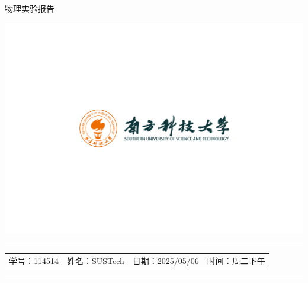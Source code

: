 \documentclass[12pt,a4paper]{article}
\begin{document}
	\noindent
	\hspace{-2em}
	\begin{minipage}[c]{0.65\textwidth}
		\raggedright
		{\fontsize{40pt}{60pt}\selectfont 物理实验报告}
	\end{minipage}
	\begin{minipage}[c]{0.35\textwidth}
		\raggedleft
		\includegraphics[width=\linewidth, trim={20cm 20cm 20cm 20cm}, clip]{university_logo.png}
	\end{minipage}

	\vspace{-1em}
	

	
	\hrule
	\vspace{0.4em}
	\noindent
	\begin{tabular}{l l l l}
    学号：\underline{114514} & 姓名：\underline{SUSTech} &
    日期：\underline{2025/05/06} & 时间：\underline{周二下午}
	\end{tabular}
	\vspace{-0em}
	\par
	\hrule

	

\end{document}
